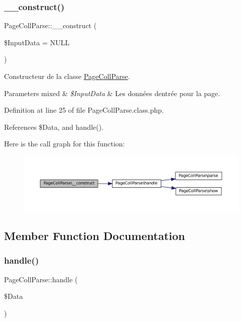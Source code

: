 \subsubsection{\texorpdfstring{\+\_\+\+\_\+construct()}{\_\_construct()}}
{\footnotesize\ttfamily Page\+Coll\+Parse\+::\+\_\+\+\_\+construct (\begin{DoxyParamCaption}\item[{}]{\$\+Input\+Data = {\ttfamily NULL} }\end{DoxyParamCaption})}

Constructeur de la classe \hyperlink{class_page_coll_parse}{Page\+Coll\+Parse}.


\begin{DoxyParams}[1]{Parameters}
mixed & {\em \$\+Input\+Data} & Les données d\textquotesingle{}entrée pour la page. \\
\hline
\end{DoxyParams}


Definition at line 25 of file Page\+Coll\+Parse.\+class.\+php.



References \$\+Data, and handle().

Here is the call graph for this function\+:\nopagebreak
\begin{figure}[H]
\begin{center}
\leavevmode
\includegraphics[width=350pt]{class_page_coll_parse_a5a6465bed563b202301f5cbc6aff4d6b_cgraph}
\end{center}
\end{figure}


\subsection{Member Function Documentation}
\mbox{\label{class_page_coll_parse_a820526f8ea9a75f90ee25057bb7d072a}} 
\subsubsection{\texorpdfstring{handle()}{handle()}}
{\footnotesize\ttfamily Page\+Coll\+Parse\+::handle (\begin{DoxyParamCaption}\item[{}]{\$\+Data }\end{DoxyParamCaption})\hspace{0.3cm}{\ttfamily [protected]}}

